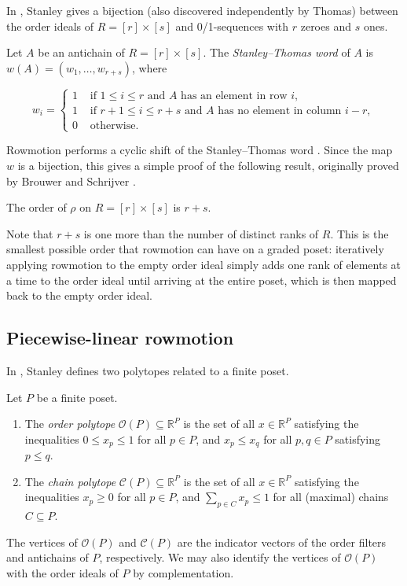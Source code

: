 \documentclass[11pt]{article}
\theoremstyle{definition}
\numberwithin{equation}{section}
\numberwithin{equation}{section}
\newcommand{\op}{\mathcal{O}(P)}
\newcommand{\cp}{\mathcal{C}(P)}
\begin{document}
In \cite{stanley1}, Stanley gives a bijection (also discovered independently by Thomas) between the order ideals of $R = [r] \times [s]$ and 0/1-sequences with $r$ zeroes and $s$ ones.

\begin{Def}
Let $A$ be an antichain of $R = [r] \times [s]$. The \emph{Stanley--Thomas word} of $A$ is $w(A) = (w_1, \dots, w_{r+s})$, where

\[w_i = \begin{cases} 1 &\text{ if } 1\leq i \leq r \text{ and } A \text{ has an element in row } i, \\ 
1 &\text{ if } r+1 \leq i \leq r+s \text{ and } A \text{ has no element in column } i-r, \\ 
0 &\text{ otherwise.} \end{cases}\]
\end{Def}

Rowmotion performs a cyclic shift of the Stanley--Thomas word \cite{propproby}. Since the map $w$ is a bijection, this gives a simple proof of the following result, originally proved by %
Brouwer and Schrijver \cite{brouwerschrijver}.

\begin{Th}
The order of $\rho$ on $R=[r] \times [s]$ is $r+s$.
\end{Th}

Note that $r+s$ is one more than the number of distinct ranks of $R$. This is the smallest possible order that rowmotion can have on a graded poset: iteratively applying rowmotion to the empty order ideal simply adds one rank of elements at a time to the order ideal until arriving at the entire poset, which is then mapped back to the empty order ideal.

\subsection{Piecewise-linear rowmotion}

In \cite{stanley2}, Stanley defines two polytopes related to a finite poset.

\begin{Def}
Let $P$ be a finite poset. 

\begin{enumerate}
    \item The \emph{order polytope} $\op \subseteq \mathbb{R}^P$ is the set of all $x \in \mathbb{R}^P$ satisfying the inequalities $0 \leq x_p \leq 1$ for all $p \in P$, and $x_p \leq x_q$ for all $p,q \in P$ satisfying $p \leq q$.
    \item The \emph{chain polytope} $\cp \subseteq \mathbb{R}^P$ is the set of all $x \in \mathbb{R}^P$ satisfying  the inequalities $x_p \geq 0$ for all $p \in P$, and $\sum_{p \in C} x_p \leq 1$ for all (maximal) chains $C \subseteq P$.
\end{enumerate}
\end{Def}
The vertices of $\op$ and $\cp$ are the indicator vectors of the order filters and antichains of $P$, respectively. We may also identify the vertices of $\op$ with the order ideals of $P$ by complementation.
\end{document}
